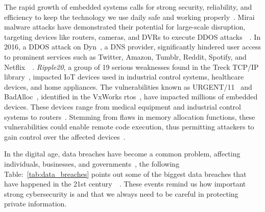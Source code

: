 The rapid growth of embedded systems calls for strong security, reliability, and
efficiency to keep the technology we use daily safe and working properly~\cite{muench2018you}.
Mirai malware attacks have demonstrated their potential for large-scale disruption, targeting devices like
routers, cameras, and DVRs to execute \gls{DDOS} attacks~\cite{KrebsOnS42:online}~\cite{antonakakis2017understanding}.
In 2016, a \acrshort{DDOS} attack on Dyn~\cite{LargeDDo94:online}, a DNS provider, significantly
hindered user access to prominent services such as Twitter, Amazon, Tumblr, Reddit, Spotify, and
Netflix~\cite{muench2018you}~\cite{lindqvist2017future}. \textit{Ripple20},
a group of 19 serious weaknesses found in the Treck TCP/IP library~\cite{TreckTCP63:online},
impacted IoT devices used in industrial control systems, healthcare devices,
and home appliances. The vulnerabilities known as URGENT/11~\cite{WhatisUR60:online}
and BadAlloc~\cite{IoTriddl27:online}, identified in the VxWorks
\gls{rtos}~\cite{VxWorksI53:online}, have impacted millions of embedded devices.
These devices range from medical equipment and industrial control systems to
routers~\cite{seri2019critical}. Stemming from flaws in memory allocation
functions, these vulnerabilities could enable remote code execution, thus
permitting attackers to gain control over the affected
devices~\cite{1NewMess42:online}.

In the digital age, data breaches have become a common problem, affecting
individuals, businesses, and governments~\cite{10oftheB31:online},
the following Table:~\ref{tab:data_breaches} points out some of the biggest data
breaches that have happened in the 21st century~\cite{The15big77:online}~\cite{10oftheB31:online}.
These events remind us how important strong cybersecurity is and that we always
need to be careful in protecting private information.

